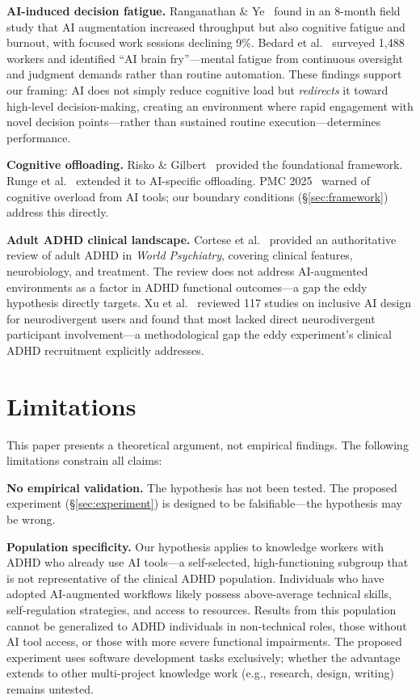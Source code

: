 \documentclass[sigconf,nonacm]{acmart}
\begin{document}
\textbf{AI-induced decision fatigue.} Ranganathan \& Ye~\cite{ranganathan2026} found in an 8-month field study that AI augmentation increased throughput but also cognitive fatigue and burnout, with focused work sessions declining 9\%. Bedard et al.~\cite{bedard2026} surveyed 1,488 workers and identified ``AI brain fry''---mental fatigue from continuous oversight and judgment demands rather than routine automation. These findings support our framing: AI does not simply reduce cognitive load but \emph{redirects} it toward high-level decision-making, creating an environment where rapid engagement with novel decision points---rather than sustained routine execution---determines performance.

\textbf{Cognitive offloading.} Risko \& Gilbert~\cite{risko2016} provided the foundational framework. Runge et al.~\cite{runge2023} extended it to AI-specific offloading. PMC 2025~\cite{pmc2025} warned of cognitive overload from AI tools; our boundary conditions (\S\ref{sec:framework}) address this directly.

\textbf{Adult ADHD clinical landscape.} Cortese et al.~\cite{cortese2025} provided an authoritative review of adult ADHD in \emph{World Psychiatry}, covering clinical features, neurobiology, and treatment. The review does not address AI-augmented environments as a factor in ADHD functional outcomes---a gap the eddy hypothesis directly targets. Xu et al.~\cite{xu2025} reviewed 117 studies on inclusive AI design for neurodivergent users and found that most lacked direct neurodivergent participant involvement---a methodological gap the eddy experiment's clinical ADHD recruitment explicitly addresses.

\section{Limitations}
\label{sec:limitations}

This paper presents a theoretical argument, not empirical findings. The following limitations constrain all claims:

\textbf{No empirical validation.} The hypothesis has not been tested. The proposed experiment (\S\ref{sec:experiment}) is designed to be falsifiable---the hypothesis may be wrong.

\textbf{Population specificity.} Our hypothesis applies to knowledge workers with ADHD who already use AI tools---a self-selected, high-functioning subgroup that is not representative of the clinical ADHD population. Individuals who have adopted AI-augmented workflows likely possess above-average technical skills, self-regulation strategies, and access to resources. Results from this population cannot be generalized to ADHD individuals in non-technical roles, those without AI tool access, or those with more severe functional impairments. The proposed experiment uses software development tasks exclusively; whether the advantage extends to other multi-project knowledge work (e.g., research, design, writing) remains untested.
\end{document}
